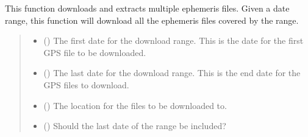 \documentclass[letterpaper,10pt,english]{sphinxmanual}
\begin{document}
\begin{fulllineitems}
\label{\detokenize{modules/gps/ephemeris:qnav.gps.ephemeris.download_rinex_files}}
\pysigstartsignatures
{}
\pysigstopsignatures
\sphinxAtStartPar
This function downloads and extracts multiple ephemeris files.
Given a date range, this function will download all the ephemeris
files covered by the range.
\begin{quote}\begin{description}
\begin{itemize}
\item {} 
\sphinxAtStartPar
{} () \textendash{} The first date for the download range.
This is the date for the first GPS file to be downloaded.

\item {} 
\sphinxAtStartPar
{} () \textendash{} The last date for the download range.
This is the end date for the GPS files to download.

\item {} 
\sphinxAtStartPar
{} () \textendash{} The location for the files to be downloaded to.

\item {} 
\sphinxAtStartPar
{} () \textendash{} Should the last date of the range be included?

\end{itemize}

\end{description}\end{quote}

\end{fulllineitems}
\end{document}
